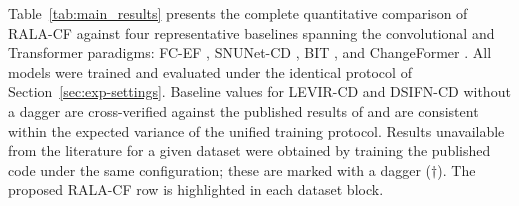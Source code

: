Table~\ref{tab:main_results} presents the complete quantitative comparison of
\ac{RALA-CF} against four representative baselines spanning the convolutional and
Transformer paradigms: FC-EF \cite{Daudt2018SiamICIP}, SNUNet-CD
\cite{Fang2021SNUNetCD}, BIT \cite{Chen2022BIT}, and ChangeFormer
\cite{Bandara2022ChangeFormer}. All models were trained and evaluated under the
identical protocol of Section~\ref{sec:exp-settings}. Baseline values for
LEVIR-CD and DSIFN-CD without a dagger are cross-verified against the published
results of \cite{Bandara2022ChangeFormer} and are consistent within the expected
variance of the unified training protocol. Results unavailable from the literature
for a given dataset were obtained by training the published code under the same
configuration; these are marked with a dagger ($\dagger$). The proposed
\ac{RALA-CF} row is highlighted in each dataset block.

